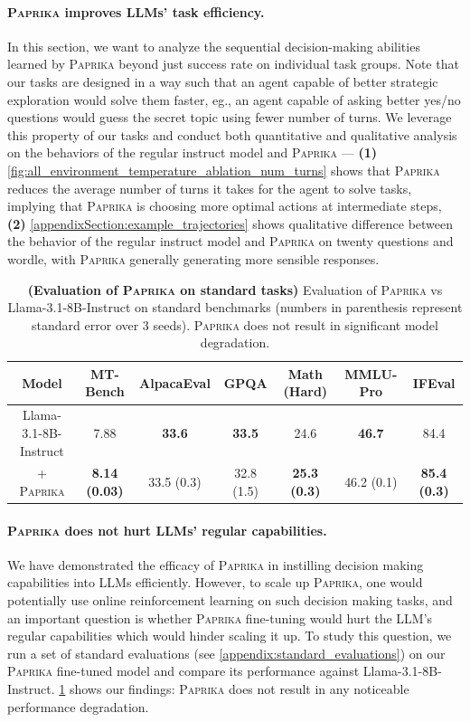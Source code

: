 \documentclass{article}
\newcommand{\ours}[1]{\textsc{Paprika}}
\theoremstyle{plain}
\theoremstyle{definition}
\theoremstyle{remark}
\begin{document}
\paragraph{\ours{} improves LLMs' task efficiency.} In this section, we want to analyze the sequential decision-making abilities learned by \ours{} beyond just success rate on individual task groups. Note that our tasks are designed in a way such that an agent capable of better strategic exploration would solve them faster, eg., an agent capable of asking better yes/no questions would guess the secret topic using fewer number of turns. We leverage this property of our tasks and conduct both quantitative and qualitative analysis on the behaviors of the regular instruct model and \ours{} --- \textbf{(1)} \cref{fig:all_environment_temperature_ablation_num_turns} shows that \ours{} reduces the average number of turns it takes for the agent to solve tasks, implying that \ours{} is choosing more optimal actions at intermediate steps,  \textbf{(2)} \cref{appendixSection:example_trajectories} shows qualitative difference between the behavior of the regular instruct model and \ours{} on twenty questions and wordle, with \ours{} generally generating more sensible responses.
\begin{table}
    \centering
        \caption{\footnotesize \textbf{(Evaluation of \ours{} on standard tasks)} Evaluation of \ours{} vs Llama-3.1-8B-Instruct on standard benchmarks (numbers in parenthesis represent standard error over 3 seeds). \ours{} does not result in significant model degradation.}
        \vspace{0.2cm}
        \begin{tabular}{c|cccccc}
            \toprule
            Model & MT-Bench & AlpacaEval & GPQA & Math (Hard) & MMLU-Pro & IFEval \\
            \midrule
             Llama-3.1-8B-Instruct & 7.88 & \textbf{33.6} & \textbf{33.5} & 24.6 & \textbf{46.7} & 84.4\\
             + \ours{} & \textbf{8.14 (0.03)} & 33.5 (0.3) & 32.8 (1.5) & \textbf{25.3 (0.3)} & 46.2 (0.1) & \textbf{85.4 (0.3)} \\
             \bottomrule
        \end{tabular}
    \vspace{-0.2cm}
    \label{tab:mt_bench_eval}
\end{table}
\paragraph{\ours{} does not hurt LLMs' regular capabilities.} We have demonstrated the efficacy of \ours{} in instilling decision making capabilities into LLMs efficiently. However, to scale up \ours{}, one would potentially use online reinforcement learning on such decision making tasks, and an important question is whether \ours{} fine-tuning would hurt the LLM's regular capabilities which would hinder scaling it up. To study this question, we run a set of standard evaluations (see \cref{appendix:standard_evaluations}) on our \ours{} fine-tuned model and compare its performance against Llama-3.1-8B-Instruct. \cref{tab:mt_bench_eval} shows our findings: \ours{} does not result in any noticeable performance degradation.
\end{document}
